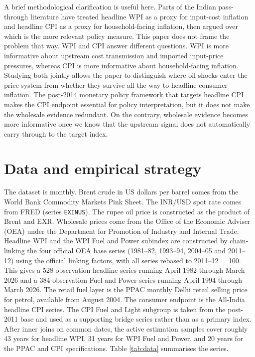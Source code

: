 \documentclass[11pt,a4paper]{article}
\begin{document}
A brief methodological clarification is useful here. Parts of the Indian pass-through literature have treated headline WPI as a proxy for input-cost inflation and headline CPI as a proxy for household-facing inflation, then argued over which is the more relevant policy measure. This paper does not frame the problem that way. WPI and CPI answer different questions. WPI is more informative about upstream cost transmission and imported input-price pressures, whereas CPI is more informative about household-facing inflation. Studying both jointly allows the paper to distinguish where oil shocks enter the price system from whether they survive all the way to headline consumer inflation. The post-2014 monetary policy framework that targets headline CPI \citep{rbi2014} makes the CPI endpoint essential for policy interpretation, but it does not make the wholesale evidence redundant. On the contrary, wholesale evidence becomes more informative once we know that the upstream signal does not automatically carry through to the target index.

\section{Data and empirical strategy}
\label{sec:data}

The dataset is monthly. Brent crude in US dollars per barrel comes from the World Bank Commodity Markets Pink Sheet. The INR/USD spot rate comes from FRED (series \texttt{EXINUS}). The rupee oil price is constructed as the product of Brent and EXR. Wholesale prices come from the Office of the Economic Adviser (OEA) under the Department for Promotion of Industry and Internal Trade. Headline WPI and the WPI Fuel and Power subindex are constructed by chain-linking the four official OEA base series (1981--82, 1993--94, 2004--05 and 2011--12) using the official linking factors, with all series rebased to 2011--12 = 100. This gives a 528-observation headline series running April 1982 through March 2026 and a 384-observation Fuel and Power series running April 1994 through March 2026. The retail fuel layer is the PPAC monthly Delhi retail selling price for petrol, available from August 2004. The consumer endpoint is the All-India headline CPI series. The CPI Fuel and Light subgroup is taken from the post-2011 base and used as a supporting bridge series rather than as a primary index. After inner joins on common dates, the active estimation samples cover roughly 43 years for headline WPI, 31 years for WPI Fuel and Power, and 20 years for the PPAC and CPI specifications. Table \ref{tab:data} summarises the series.
\end{document}
